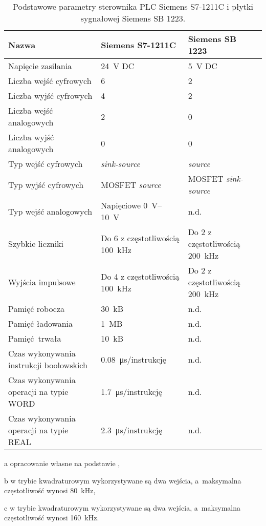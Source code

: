 \begin{table}[H]
    \centering
    \begin{threeparttable}
        \caption{Podstawowe parametry sterownika PLC Siemens S7-1211C i płytki sygnałowej Siemens SB 1223.}
        \label{tab:parametry_PLC_SB}
        
        \begin{tabular}{p{4.5cm} | l | l}
            \toprule
            Nazwa & Siemens S7-1211C & Siemens SB 1223 \\
            \midrule
            Napięcie zasilania & \SI{24}{V} DC & \SI{5}{V} DC \\
            \midrule
            Liczba wejść cyfrowych & 6 & 2 \\
            Liczba wyjść cyfrowych & 4 & 2 \\
            Liczba wejść analogowych & 2 & 0 \\
            Liczba wyjść analogowych & 0 & 0 \\
            Typ wejść cyfrowych & \textit{sink-source} & \textit{source} \\
            Typ wyjść cyfrowych & MOSFET \textit{source} & MOSFET \textit{sink-source} \\
            Typ wejść analogowych & Napięciowe \SIrange{0}{10}{V} & n.d. \\
            \midrule
            Szybkie liczniki & Do 6 z częstotliwością \SI{100}{kHz}\tnote{b} & Do 2 z częstotliwością \SI{200}{kHz}\tnote{c} \\
            Wyjścia impulsowe & Do 4 z częstotliwością \SI{100}{kHz} & Do 2 z częstotliwością \SI{200}{kHz} \\
            \midrule
            Pamięć robocza & \SI{30}{kB} & n.d. \\
            Pamięć ładowania & \SI{1}{MB} & n.d. \\
            Pamięć trwała & \SI{10}{kB} & n.d. \\
            \midrule
            Czas wykonywania instrukcji boolowskich & \SI{0,08}{\micro\second}/instrukcję & n.d. \\
            Czas wykonywania operacji na typie WORD & \SI{1,7}{\micro\second}/instrukcję & n.d. \\
            Czas wykonywania operacji na typie REAL & \SI{2,3}{\micro\second}/instrukcję & n.d. \\
            \bottomrule
        \end{tabular}
        
        \begin{tablenotes}
            \footnotesize
            \item[a] opracowanie własne na podstawie \cite{S7MANUAL},
            \item[b] w trybie kwadraturowym wykorzystywane są dwa wejścia, a~maksymalna częstotliwość wynosi \SI{80}{kHz},
            \item[c] w trybie kwadraturowym wykorzystywane są dwa wejścia, a~maksymalna częstotliwość wynosi \SI{160}{kHz}.
        \end{tablenotes}
    \end{threeparttable}
\end{table}

